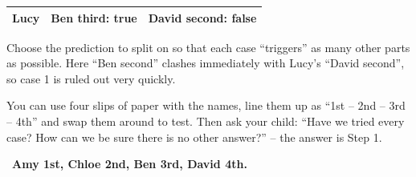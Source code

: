 \documentclass[11pt]{article}
\providecommand{\AnsWord}{Đáp số}
\newcommand{\ans}[1]{\par\smallskip{\bfseries\color{tmGreen!88!black}\AnsWord:}\ {\bfseries\color{AnsRed}#1}\par}
\def\AnsWord{Answer}
\begin{document}
{\begin{center}
\begin{tabular}{|l|c|c|}
Lucy & Ben third: \textcolor{tmGreen!70!black}{true} & David second: \textcolor{AnsRed}{false} \\ \hline
\end{tabular}
\end{center}
\begin{tipbox}Choose the prediction to split on so that each case ``triggers'' as many other parts as possible. Here ``Ben second'' clashes
immediately with Lucy's ``David second'', so case 1 is ruled out very quickly.\end{tipbox}
\begin{parentbox}You can use four slips of paper with the names, line them up as ``1st -- 2nd -- 3rd -- 4th'' and swap them around to test.
Then ask your child: ``Have we tried every case? How can we be sure there is no other answer?'' -- the answer is Step 1.\end{parentbox}
\ans{Amy 1st, Chloe 2nd, Ben 3rd, David 4th.}
}
\end{document}
